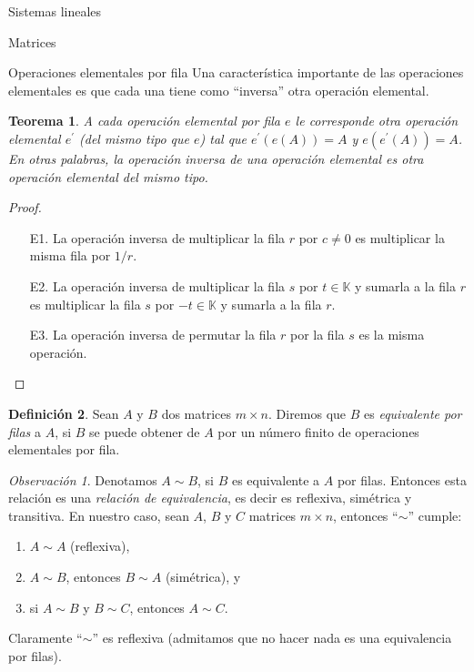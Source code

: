 \documentclass[a4paper,12pt,twoside,spanish,reqno]{amsbook}
\numberwithin{equation}{section}
\newtheorem{teorema}{Teorema}[section]
\theoremstyle{definition}
\newtheorem{definicion}[teorema]{Definici\'on}
\theoremstyle{remark}
\newtheorem*{obs*}{Observaci\'on}
\newcommand{\K}{\mathbb K}
\begin{document}
\begin{chapter}{Sistemas lineales}
\begin{section}{Matrices}
\begin{subsection}{Operaciones elementales por fila}
                Una característica importante de las operaciones elementales es que cada una tiene como ``inversa'' otra operación elemental. 
                
                \begin{teorema}\label{op-elem}
                    A cada operación elemental por fila $e$ le corresponde otra operación elemental $e^\prime$ (del mismo tipo que $e$) tal que $e^\prime(e(A)) = A$ y $e(e^\prime(A)) = A$. En otras palabras, la operación inversa de una operación elemental es otra operación elemental del mismo tipo.  
                \end{teorema}
                \begin{proof} \
                    \begin{enumerate}
                        \item[E1.] La operación inversa de multiplicar la fila $r$ por $c\not=0$ es multiplicar la misma fila por $1/r$.
                        \item[E2.] La operación inversa de multiplicar la fila $s$ por  $t \in \K$ y sumarla a la fila $r$ es multiplicar  la fila $s$ por  $-t \in \K$ y sumarla a la fila $r$.
                        \item[E3.] La operación inversa de permutar la fila $r$ por la fila $s$ es la misma operación.
                    \end{enumerate}
                \end{proof}
                
                \begin{definicion} 
                    Sean $A$ y $B$ dos matrices $m \times n$. Diremos que $B$ es \textit{equivalente por filas} a $A$, si $B$ se puede obtener de $A$ por un número finito de operaciones elementales por fila. 
                \end{definicion}
            

                \begin{obs*} Denotamos $A \sim B$, si $B$ es equivalente a $A$ por filas. Entonces esta relación es una \textit{relación de equivalencia}, es decir es reflexiva, simétrica y transitiva. En  nuestro caso, sean $A$, $B$ y $C$ matrices $m \times n$, entonces ``$\sim$'' cumple: 
                    \begin{enumerate}
                        \item  $A \sim A$ (reflexiva), 
                        \item $A \sim B$, entonces $B \sim A$ (simétrica), y
                        \item si $A \sim B$ y $B \sim C$, entonces $A \sim C$.   
                    \end{enumerate}
                    Claramente ``$\sim$'' es reflexiva (admitamos que no hacer nada es una equivalencia por filas). 
                    

\end{obs*}
\end{subsection}
\end{section}
\end{chapter}
\end{document}

